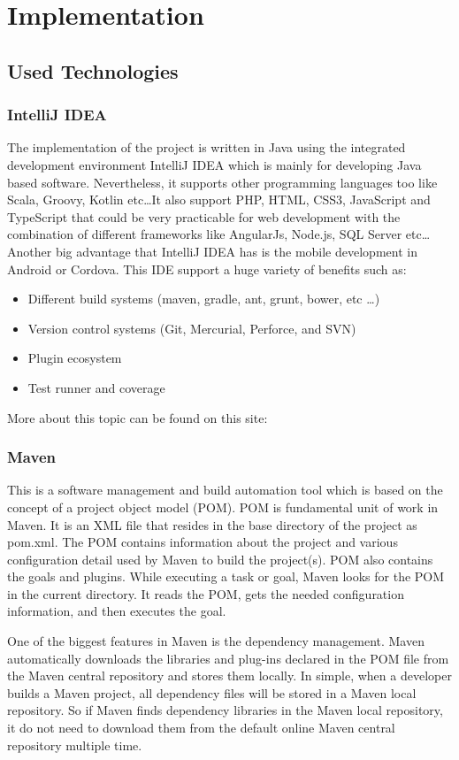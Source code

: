 \chapter{Implementation}
\lstset{language=NoBeardAsm}
\section{Used Technologies}
\subsection{IntelliJ IDEA} 
The implementation of the project is written in Java using the integrated development environment IntelliJ IDEA which is mainly for developing Java based software. Nevertheless, it supports other programming languages too like Scala, Groovy, Kotlin etc\ldots It also support PHP, HTML, CSS3, JavaScript and TypeScript that could be very practicable for web development with the combination of different frameworks like AngularJs, Node.js, SQL Server etc… Another big advantage that IntelliJ IDEA has is the mobile development in Android or Cordova. 
This IDE support a huge variety of benefits such as:
\begin{itemize}
\item Different build systems (maven, gradle, ant, grunt, bower, etc \ldots)
\item Version control systems (Git, Mercurial, Perforce, and SVN)
\item Plugin ecosystem
\item Test runner and coverage
\end{itemize}
More about this topic can be found on this site: \cite{intellij_intellij_nodate}

\subsection{Maven} 
This is a software management and build automation tool which is based on the concept of a project object model (POM). POM is fundamental unit of work in Maven. It is an XML file that resides in the base directory of the project as pom.xml.
The POM contains information about the project and various configuration detail used by Maven to build the project(s).
POM also contains the goals and plugins. While executing a task or goal, Maven looks for the POM in the current directory. It reads the POM, gets the needed configuration information, and then executes the goal. 

One of the biggest features in Maven is the dependency management. Maven automatically downloads the libraries and plug-ins declared in the POM file from the Maven central repository and stores them locally. In simple, when a developer builds a Maven project, all dependency files will be stored in a Maven local repository. So if Maven finds dependency libraries in the Maven local repository, it do not need to download them from the default online Maven central repository multiple time.

